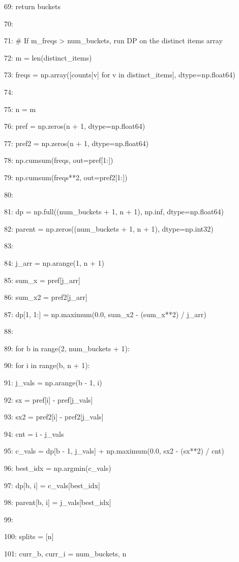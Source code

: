 \documentclass[11pt,a4paper]{article}
\begin{document}
69:         return buckets

70:

71:     \# If m\_freqs > num\_buckets, run DP on the distinct items array

72:     m = len(distinct\_items)

73:     freqs = np.array([counts[v] for v in distinct\_items], dtype=np.float64)

74:

75:     n = m

76:     pref = np.zeros(n + 1, dtype=np.float64)

77:     pref2 = np.zeros(n + 1, dtype=np.float64)

78:     np.cumsum(freqs, out=pref[1:])

79:     np.cumsum(freqs**2, out=pref2[1:])

80:

81:     dp = np.full((num\_buckets + 1, n + 1), np.inf, dtype=np.float64)

82:     parent = np.zeros((num\_buckets + 1, n + 1), dtype=np.int32)

83:

84:     j\_arr = np.arange(1, n + 1)

85:     sum\_x = pref[j\_arr]

86:     sum\_x2 = pref2[j\_arr]

87:     dp[1, 1:] = np.maximum(0.0, sum\_x2 - (sum\_x**2) / j\_arr)

88:

89:     for b in range(2, num\_buckets + 1):

90:         for i in range(b, n + 1):

91:             j\_vals = np.arange(b - 1, i)

92:             sx = pref[i] - pref[j\_vals]

93:             sx2 = pref2[i] - pref2[j\_vals]

94:             cnt = i - j\_vals

95:             c\_vals = dp[b - 1, j\_vals] + np.maximum(0.0, sx2 - (sx**2) / cnt)

96:             best\_idx = np.argmin(c\_vals)

97:             dp[b, i] = c\_vals[best\_idx]

98:             parent[b, i] = j\_vals[best\_idx]

99:

100:     splits = [n]

101:     curr\_b, curr\_i = num\_buckets, n
\end{document}

